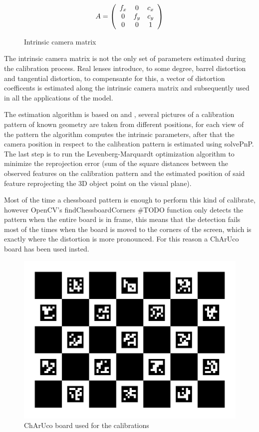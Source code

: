\begin{figure}[h]
\caption{Intrinsic camera matrix}
\label{fig:camera_matrix}
\[A = \left (
  \begin{array}{ c c c}
  f_x & 0   & c_x \\
   0  & f_y & c_y \\
   0  & 0   & 1 \\
  \end{array}
\right )\]
\end{figure}


The intrinsic camera matrix is not the only set of parameters estimated during the calibration process. Real lenses introduce, to some degree, barrel distortion and tangential distortion, to compensante for this, a vector of distortion coefficents is estimated along the intrinsic camera matrix and subsequently used in all the applications of the model.\newline


The estimation algorithm is based on \cite{888718} and \cite{matlab}, several pictures of a calibration pattern of known geometry are taken from different positions, for each view of the pattern the algorithm computes the intrinsic parameters, after that the camera position in respect to the calibration pattern is estimated using solvePnP\cite{opencvsolvepnp}. The last step is to run the Levenberg-Marquardt optimization algorithm to minimize the reprojection error (sum of the square distances between the observed features on the calibration pattern and the estimated position of said feature reprojecting the 3D object point on the visual plane).

Most of the time a chessboard pattern is enough to perform this kind of calibrate, however OpenCV's findChessboardCorners \#TODO function only detects the pattern when the entire board is in frame, this means that the detection fails most of the times when the board is moved to the corners of the screen, which is exactly where the distortion is more pronounced. For this reason a ChArUco board has been used insted.

\begin{figure}[h]
  \centering
  \includegraphics[scale=0.15]{figures/charucoboard.png}
  \caption{ChArUco board used for the calibrations}
  \label{img:ch_board}
\end{figure}

